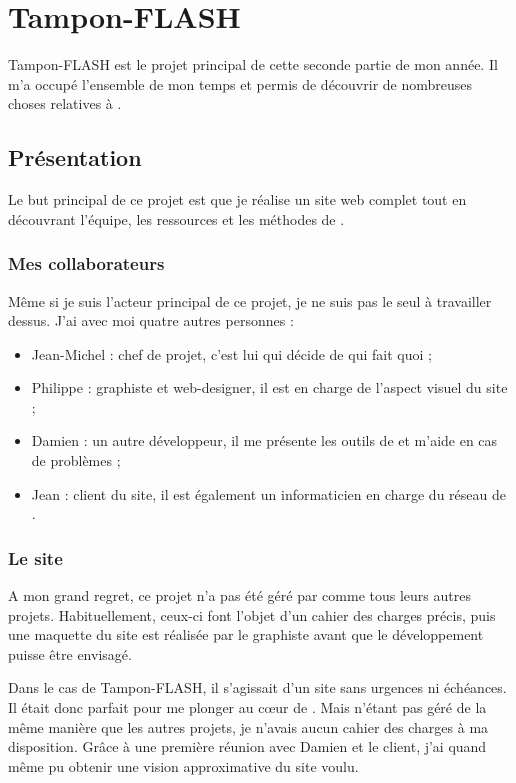 \chapter{Tampon-FLASH}
Tampon-FLASH est le projet principal de cette seconde partie de mon année. Il m'a occupé l'ensemble de mon temps et permis de découvrir de nombreuses choses relatives à \fidit.

\section{Présentation}
Le but principal de ce projet est que je réalise un site web complet tout en découvrant l'équipe, les ressources et les méthodes de \fidit.

\subsection{Mes collaborateurs}
Même si je suis l'acteur principal de ce projet, je ne suis pas le seul à travailler dessus. J'ai avec moi quatre autres personnes :
\begin{itemize}
	\item Jean-Michel  : chef de projet, c'est lui qui décide de qui fait quoi ;
	\item Philippe  : graphiste et web-designer, il est en charge de l'aspect visuel du site ;
	\item Damien  : un autre développeur, il me présente les outils de \fidit{} et m'aide en cas de problèmes ;
	\item Jean  : client du site, il est également un informaticien en charge du réseau de \fidit.
\end{itemize}

\subsection{Le site}
A mon grand regret, ce projet n'a pas été géré par \fidit{} comme tous leurs autres projets. Habituellement, ceux-ci font l'objet d'un cahier des charges précis, puis une maquette du site est réalisée par le graphiste avant que le développement puisse être envisagé.

Dans le cas de Tampon-FLASH, il s'agissait d'un site sans urgences ni échéances. Il était donc parfait pour me plonger au cœur de \fidit. Mais n'étant pas géré de la même manière que les autres projets, je n'avais aucun cahier des charges à ma disposition. Grâce à une première réunion avec Damien et le client, j'ai quand même pu obtenir une vision approximative du site voulu.


